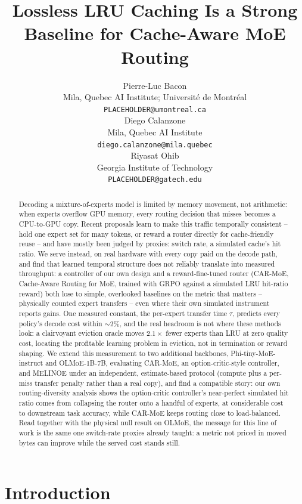 \documentclass{article}
\title{Lossless LRU Caching Is a Strong Baseline for Cache-Aware MoE Routing}
\author{
  Pierre-Luc Bacon \\
  Mila, Quebec AI Institute; Universit\'e de Montr\'eal \\
  \texttt{PLACEHOLDER@umontreal.ca} \\[1em]
  Diego Calanzone \\
  Mila, Quebec AI Institute \\
  \texttt{diego.calanzone@mila.quebec} \\[1em]
  Riyasat Ohib \\
  Georgia Institute of Technology \\
  \texttt{PLACEHOLDER@gatech.edu}
}
\begin{document}
\maketitle

\begin{abstract}
Decoding a mixture-of-experts model is limited by memory movement, not arithmetic: when
experts overflow GPU memory, every routing decision that misses becomes a CPU-to-GPU copy.
Recent proposals learn to make this traffic temporally consistent -- hold one expert set for
many tokens, or reward a router directly for cache-friendly reuse -- and have mostly been
judged by proxies: switch rate, a simulated cache's hit ratio. We serve instead, on real
hardware with every copy paid on the decode path, and find that learned temporal structure
does not reliably translate into measured throughput: a controller of our own design and a
reward-fine-tuned router (CAR-MoE, Cache-Aware Routing for MoE, trained with GRPO against a
simulated LRU hit-ratio reward) both lose to simple, overlooked baselines on the metric that
matters -- physically counted expert transfers -- even where their own simulated instrument
reports gains. One measured constant, the per-expert transfer time $\tau$, predicts every
policy's decode cost within $\sim$2\%, and the real headroom is not where these methods look:
a clairvoyant eviction oracle moves $2.1\times$ fewer experts than LRU at zero quality cost,
locating the profitable learning problem in eviction, not in termination or reward shaping.
We extend this measurement to two additional backbones, Phi-tiny-MoE-instruct and
OLMoE-1B-7B, evaluating CAR-MoE, an option-critic-style controller, and MELINOE under an
independent, estimate-based protocol (compute plus a per-miss transfer penalty rather than a
real copy), and find a compatible story: our own routing-diversity analysis shows the
option-critic controller's near-perfect simulated hit ratio comes from collapsing the router
onto a handful of experts, at considerable cost to downstream task accuracy, while CAR-MoE
keeps routing close to load-balanced. Read together with the physical null result on OLMoE,
the message for this line of work is the same one switch-rate proxies already taught: a
metric not priced in moved bytes can improve while the served cost stands still.
\end{abstract}

\section{Introduction}
\end{document}
